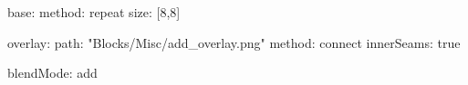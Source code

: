 base:
  method: repeat
  size: [8,8]

overlay:
  path: "Blocks/Misc/add_overlay.png"
  method: connect
  innerSeams: true

blendMode: add
  
